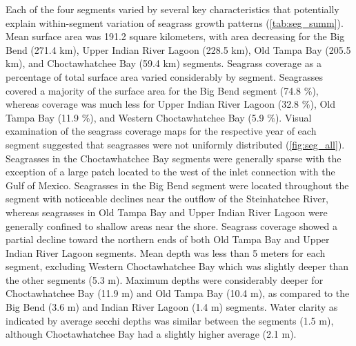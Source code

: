 \documentclass[letterpaper,12pt,oneside]{article}\usepackage[]{graphicx}\usepackage[]{color}
\begin{document}
Each of the four segments varied by several key characteristics that potentially explain within-segment variation of seagrass growth patterns (\cref{tab:seg_summ}).  Mean surface area was 191.2 square kilometers, with area decreasing for the Big Bend (271.4 km), Upper Indian River Lagoon (228.5 km), Old Tampa Bay (205.5 km), and Choctawhatchee Bay (59.4 km) segments.  Seagrass coverage as a percentage of total surface area varied considerably by segment.  Seagrasses covered a majority of the surface area for the Big Bend segment (74.8 \%), whereas coverage was much less for Upper Indian River Lagoon (32.8 \%), Old Tampa Bay (11.9 \%), and Western Choctawhatchee Bay (5.9 \%).  Visual examination of the seagrass coverage maps for the respective year of each segment suggested that seagrasses were not uniformly distributed (\cref{fig:seg_all}).  Seagrasses in the Choctawhatchee Bay segments were generally sparse with the exception of a large patch located to the west of the inlet connection with the Gulf of Mexico.  Seagrasses in the Big Bend segment were located throughout the segment with noticeable declines near the outflow of the Steinhatchee River, whereas seagrasses in Old Tampa Bay and Upper Indian River Lagoon were generally confined to shallow areas near the shore. Seagrass coverage showed a partial decline toward the northern ends of both Old Tampa Bay and Upper Indian River Lagoon segments.  Mean depth was less than 5 meters for each segment, excluding Western Choctawhatchee Bay which was slightly deeper than the other segments (5.3 m).  Maximum depths were considerably deeper for Choctawhatchee Bay (11.9 m) and Old Tampa Bay (10.4 m), as compared to the Big Bend (3.6 m) and Indian River Lagoon (1.4 m) segments.  Water clarity as indicated by average secchi depths was similar between the segments (1.5 m), although Choctawhatchee Bay had a slightly higher average (2.1 m).     

\end{document}
